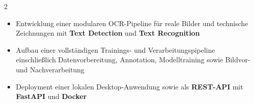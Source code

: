 \documentclass[10pt,a4paper,withhyper]{../altacv}
\begin{document}
\begin{paracol}{2}

  \vspace{0.5em}


  \vspace{0.5em}


  \divider\smallskip


  \vspace{0.5em}


  \vspace{0.5em}

  
  \vspace{0.5em}
  


  \newpage

  \vspace{0.5em}


  \vspace{0.5em}


  \vspace{0.5em}



  \medskip

  \newpage

  \switchcolumn


  \vspace{1em}


  \vspace{0.5em}

  \begin{itemize}
    \item Entwicklung einer modularen OCR-Pipeline für reale Bilder und technische Zeichnungen mit \textbf{Text Detection} und \textbf{Text Recognition}
    \item Aufbau einer vollständigen Trainings- und Verarbeitungspipeline einschließlich Datenvorbereitung, Annotation, Modelltraining sowie Bildvor- und Nachverarbeitung
    \item Deployment einer lokalen Desktop-Anwendung sowie als \textbf{REST-API} mit \textbf{FastAPI} und \textbf{Docker}
  \end{itemize}


\end{paracol}
\end{document}
